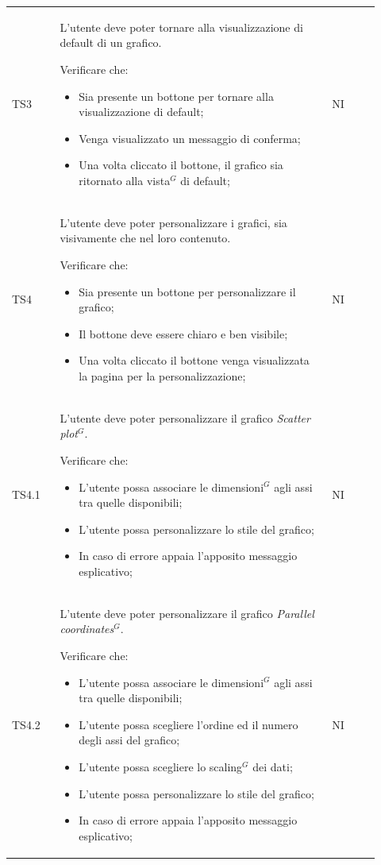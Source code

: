 \begin{longtable}{p{0.12\linewidth}p{0.68\linewidth}p{0.12\linewidth}}
    \rowcolor[RGB]{233, 245, 206}
    TS3 & 
    L'utente deve poter tornare alla visualizzazione di default di un grafico. \par 
    Verificare che:
    \begin{itemize}
        \item Sia presente un bottone per tornare alla visualizzazione di default;
        \item Venga visualizzato un messaggio di conferma;
        \item Una volta cliccato il bottone, il grafico sia ritornato alla vista$^{G}$ di default;
    \end{itemize}&
    NI\\

    \rowcolor[RGB]{216, 235, 171}
    TS4 &
    L'utente deve poter personalizzare i grafici, sia visivamente che nel loro contenuto. \par
    Verificare che:
    \begin{itemize}
        \item Sia presente un bottone per personalizzare il grafico;
        \item Il bottone deve essere chiaro e ben visibile;
        \item Una volta cliccato il bottone venga visualizzata la pagina per la personalizzazione;
    \end{itemize}&
    NI\\

    \rowcolor[RGB]{233, 245, 206}
    TS4.1 &
    L'utente deve poter personalizzare il grafico \textit{Scatter plot}$^{G}$. \par
    Verificare che:
    \begin{itemize}
        \item L'utente possa associare le dimensioni$^{G}$ agli assi tra quelle disponibili;
        \item L'utente possa personalizzare lo stile del grafico;
        \item In caso di errore appaia l'apposito messaggio esplicativo;
    \end{itemize}&
    NI \\

    \rowcolor[RGB]{216, 235, 171}
    TS4.2 &
    L'utente deve poter personalizzare il grafico \textit{Parallel coordinates}$^{G}$. \par
    Verificare che:
    \begin{itemize}
        \item L'utente possa associare le dimensioni$^{G}$ agli assi tra quelle disponibili;
        \item L'utente possa scegliere l'ordine ed il numero degli assi del grafico;
        \item L'utente possa scegliere lo scaling$^{G}$ dei dati;
        \item L'utente possa personalizzare lo stile del grafico;
        \item In caso di errore appaia l'apposito messaggio esplicativo;
    \end{itemize}&
    NI \\


\end{longtable}
